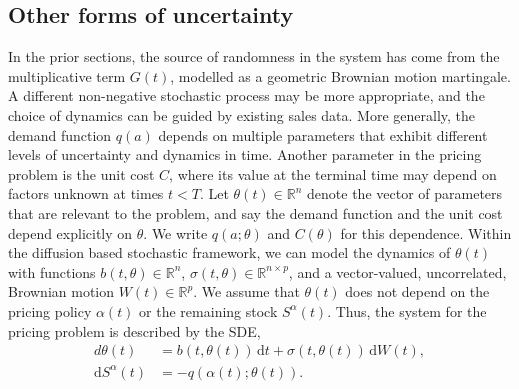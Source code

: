 \documentclass[main.tex]{subfiles}
\begin{document}
\subsection{Other forms of uncertainty}
In the prior sections, the source of randomness in the system has come from
the multiplicative term $G(t)$, modelled as a geometric Brownian
motion martingale. A different non-negative stochastic process may be more appropriate, and the
choice of dynamics can be guided by existing sales data.
More generally, the demand function $q(a)$ depends on multiple
parameters that exhibit different levels of
uncertainty and dynamics in time. Another parameter in the pricing
problem is the unit cost $C$, where its value at the terminal time may
depend on factors unknown at times $t<T$.
Let $\theta(t)\in\mathbb{R}^n$ denote the vector of parameters that are
relevant to the problem, and say the demand function  and the unit cost
depend explicitly on $\theta$. We write $q(a;\theta)$ and $C(\theta)$
for this dependence.
Within the diffusion based stochastic framework, we can model the
dynamics of $\theta(t)$ with functions $b(t,\theta)\in\mathbb{R}^n$,
$\sigma(t,\theta)\in\mathbb{R}^{n\times p}$, and a vector-valued, uncorrelated,
Brownian motion $W(t)\in\mathbb{R}^p$.
We assume that $\theta(t)$ does not depend on the pricing policy
$\alpha(t)$ or the remaining
stock $S^\alpha(t)$. Thus,
the system for the pricing problem is described by the SDE,
\begin{align}
  d\theta(t)&=b(t,\theta(t))\,\mathrm{d}t + \sigma(t,\theta(t))\,\mathrm{d}W(t),\\
  \mathrm{d}S^\alpha(t)&=-q(\alpha(t);\theta(t)).
\end{align}
\end{document}
